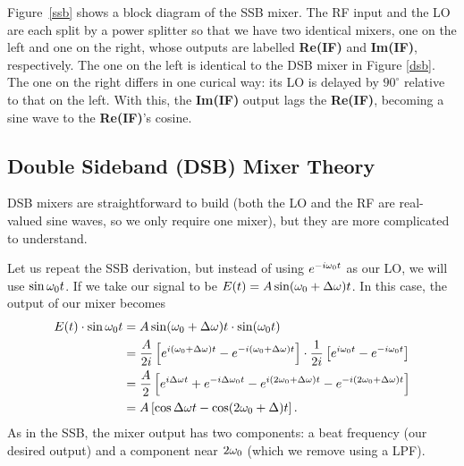 \documentclass[11pt,preprint]{aastex}
\begin{document}
Figure\ \ref{ssb} shows a block diagram of the SSB mixer.  The RF input
and the LO are each split by a power splitter so that we have two
identical mixers, one on the left and one on the right, whose outputs
are labelled {\bf Re(IF)} and {\bf Im(IF)}, respectively. The one on
the left is identical to the DSB mixer in Figure \ref{dsb}. The one on
the right differs in one curical way: its LO is delayed
by $90^\circ$ relative to that on the left. With this, the {\bf Im(IF)}
output lags the {\bf Re(IF)}, becoming a sine wave to the {\bf Re(IF)}'s 
cosine.



\subsection {Double Sideband (DSB) Mixer Theory}
%
\noindent
DSB mixers are
straightforward to build (both the LO and the RF are real-valued sine waves, so we only
require one mixer),
but they are more complicated to understand.

Let us repeat the SSB derivation, but instead of
using $e^{-i\omega_0 t}$ as our LO, we will use $\sin \omega_0 t$.
If we take our signal to be $E(t)=A\sin(\omega_0+\Delta\omega)t$.  In this case,
the output of our mixer becomes
\begin{align}
E(t)\cdot \sin\omega_0 t &= A\sin (\omega_0 +\Delta\omega)t\cdot \sin (\omega_0 t)\\
&= \frac{A}{2i}\left[e^{i(\omega_0 +\Delta\omega)t}-e^{-i(\omega_0 +\Delta\omega)t}\right]\cdot
  \frac{1}{2i}\left[e^{i\omega_0 t}-e^{-i\omega_0 t}\right] \\
&= \frac{A}{2}\left[e^{i\Delta\omega t}+e^{-i\Delta\omega_0 t} -
  e^{i(2\omega_0 +\Delta\omega) t}-e^{-i(2\omega_0 +\Delta\omega)t}\right]\\
&= A\left[\cos\Delta\omega t - \cos(2\omega_0 +\Delta)t\right].
\end{align}
As in the SSB, the mixer output has two components: a beat frequency (our
desired output) and a component near $2\omega_0 $ (which we remove using a LPF).
\end{document}
